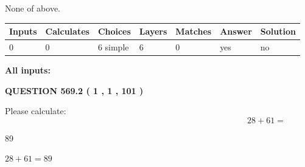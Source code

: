 \documentclass[12pt]{article}
\begin{document}
 
\noindent{}
 
 
 None of above.
 
 
\noindent{}
 
 
   
   
   
   
\noindent\begin{tabular}{|l|l|l|l|l|l|l|}
 \hline
Inputs & Calculates & Choices & Layers & Matches & Answer & Solution \\ \hline
 0  & 
 0  & 
 6
  simple  
  & 
 6  & 
 0  & 
  yes & 
  no 
  \\ \hline
 \end{tabular}
   
   
   
   
\noindent{}
   
   
   
   
\noindent\vspace{0.1in}\hspace{-0.08in} {\textbf{\Large{All inputs: }}}
   
   
  
\vspace{0.2in}
  
{\textbf{\Large{QUESTION
569.2 
 ( 1 , 1 , 101 )
}}}
  
  
 
Please calculate:
\begin{equation}
28 +  %
61 = \nonumber
\end{equation}
 
 
 
\noindent{}
 
 

89
 
 
\noindent{}
 
 

 
 
 
\noindent{}
 
 

$ %
28 +  %
61=   %
89$
 
\end{document}
